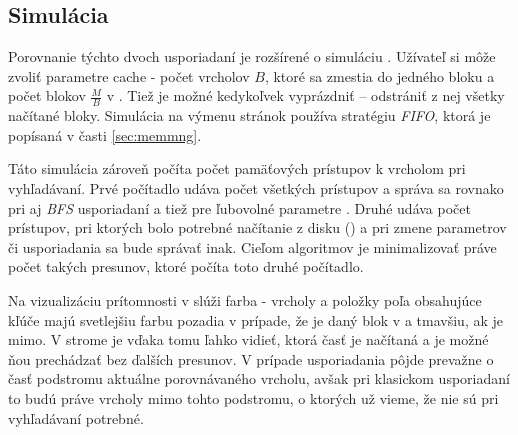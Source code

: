 \subsection{Simulácia \cache}
Porovnanie týchto dvoch usporiadaní je rozšírené o simuláciu \cache. Užívateľ si môže zvoliť parametre cache - počet vrcholov $B$, ktoré sa zmestia do jedného bloku a počet blokov $\frac{M}{B}$ v \cache. Tiež je možné \cache kedykoľvek vyprázdniť -- odstrániť z nej všetky načítané bloky. Simulácia na výmenu stránok používa stratégiu \emph{FIFO}, ktorá je popísaná v časti \ref{sec:memmng}.

Táto simulácia zároveň počíta počet pamäťových prístupov k vrcholom pri vyhľadávaní. Prvé počítadlo udáva počet všetkých prístupov a správa sa rovnako pri  aj \emph{BFS} usporiadaní a tiež pre ľubovolné parametre \cache. Druhé udáva počet prístupov, pri ktorých bolo potrebné načítanie z disku (\miss) a pri zmene parametrov či usporiadania sa bude správať inak. Cieľom \obliv algoritmov je minimalizovať práve počet takých presunov, ktoré počíta toto druhé počítadlo.



Na vizualizáciu prítomnosti v \cache slúži farba - vrcholy a položky poľa obsahujúce kľúče majú svetlejšiu farbu pozadia v prípade, že je daný blok v \cache a tmavšiu, ak je mimo. V strome je vďaka tomu ľahko vidieť, ktorá časť je načítaná a je možné ňou prechádzať bez ďalších presunov. V prípade  usporiadania pôjde prevažne o časť podstromu aktuálne porovnávaného vrcholu, avšak pri klasickom usporiadaní to budú práve vrcholy mimo tohto podstromu, o ktorých už vieme, že nie sú pri vyhľadávaní potrebné.

